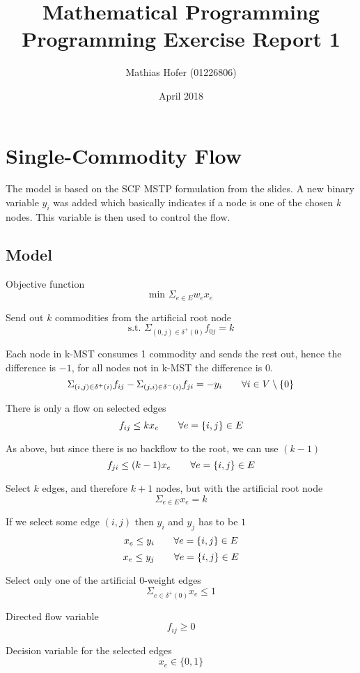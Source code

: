 \documentclass{article}
\title{Mathematical Programming\\Programming Exercise Report 1}
\author{Mathias Hofer (01226806)}
\date{April 2018}
\begin{document}
\maketitle

\section{Single-Commodity Flow}


The model is based on the SCF MSTP formulation from the slides. A new binary variable $y_i$ was added which basically indicates if a node is one of the chosen $k$ nodes. This variable is then used to control the flow.

\subsection{Model}
Objective function
\[\text{min } \Sigma_{e \in E} w_e x_e\]

\noindent
Send out $k$ commodities from the artificial root node
\[\text{s.t. } \Sigma_{(0,j) \in \delta^+(0)} f_{0 j} = k\]

\noindent
Each node in k-MST consumes 1 commodity and sends the rest out, hence the difference is $-1$, for all nodes not in k-MST the difference is $0$.
\[ \Sigma_{(i,j) \in \delta^+(i)} f_{i j} - \Sigma_{(j,i) \in \delta^-(i)} f_{j i} = -y_i \tag*{$\forall i \in V \setminus \{0\}$}\]

\noindent
There is only a flow on selected edges
\[f_{i j} \leq k x_e \tag*{$\forall e = \{i, j\} \in E$}\]

\noindent
As above, but since there is no backflow to the root, we can use $(k - 1)$
\[f_{j i} \leq (k - 1) x_e \tag*{$\forall e = \{i, j\} \in E$}\]

\noindent
Select $k$ edges, and therefore $k + 1$ nodes, but with the artificial root node
\[\Sigma_{e \in E} x_e = k \]

\noindent
If we select some edge $(i,j)$ then $y_i$ and $y_j$ has to be $1$
\[x_e \leq y_i \tag*{$\forall e = \{i, j\} \in E$}\]
\[x_e \leq y_j \tag*{$\forall e = \{i, j\} \in E$}\]

\noindent
Select only one of the artificial 0-weight edges
\[\Sigma_{e \in \delta^+(0)} x_e \le 1\]

\noindent
Directed flow variable
\[f_{i j} \geq 0 \tag*{$\forall (i,j) \in A$}\]

\noindent
Decision variable for the selected edges
\[x_e \in \{0,1\} \tag*{$\forall e \in E$}\]
\end{document}
